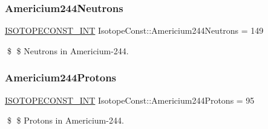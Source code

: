 \subsubsection{\texorpdfstring{Americium244\+Neutrons}{Americium244Neutrons}}
{\footnotesize\ttfamily \mbox{\hyperlink{group___isotope_const-_macros_ga5f18360b3e99483a35c32d789e62621c}{I\+S\+O\+T\+O\+P\+E\+C\+O\+N\+S\+T\+\_\+\+I\+NT}} Isotope\+Const\+::\+Americium244\+Neutrons = 149}

\$ \$ Neutrons in Americium-\/244. \mbox{\label{group___isotope_const-_americium-_am244_ga3c2073d2618f601e7504d32ac9575fde}} 
\subsubsection{\texorpdfstring{Americium244\+Protons}{Americium244Protons}}
{\footnotesize\ttfamily \mbox{\hyperlink{group___isotope_const-_macros_ga5f18360b3e99483a35c32d789e62621c}{I\+S\+O\+T\+O\+P\+E\+C\+O\+N\+S\+T\+\_\+\+I\+NT}} Isotope\+Const\+::\+Americium244\+Protons = 95}

\$ \$ Protons in Americium-\/244. 